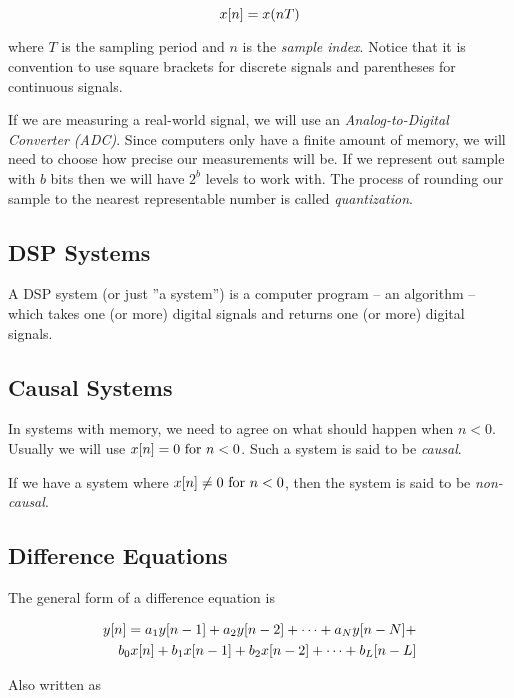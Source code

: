 \documentclass[11pt]{article}
\let\originalleft\left
\let\originalright\right
\renewcommand{\left}{\mathopen{}\mathclose\bgroup\originalleft}
\renewcommand{\right}{\aftergroup\egroup\originalright}
\def\lsqb{\left[}
\def\rsqb{\right]}
\def\sqb#1{\lsqb #1 \rsqb}
\def\xsig{x\sqb{n}}
\begin{document}
\begin{equation}
    \xsig = x(nT)
\end{equation}

where $T$ is the sampling period and $n$ is the \textit{sample index}. Notice that it is convention to use square brackets for discrete signals and parentheses for continuous signals.

If we are measuring a real-world signal, we will use an \textit{Analog-to-Digital Converter (ADC)}. Since computers only have a finite amount of memory, we will need to choose how precise our measurements will be. If we represent out sample with $b$ bits then we will have $2^b$ levels to work with. The process of rounding our sample to the nearest representable number is called \textit{quantization}.

\subsection{DSP Systems}
A DSP system (or just ''a system'') is a computer program -- an algorithm -- which takes one (or more) digital signals and returns one (or more) digital signals.

\subsection{Causal Systems}
In systems with memory, we need to agree on what should happen when $n < 0$. Usually we will use $x\left[n\right] = 0 \text{ for } n < 0$. Such a system is said to be \textit{causal}.

If we have a system where $x\left[n\right] \neq 0 \text{ for } n < 0$, then the system is said to be \textit{non-causal}.

\subsection{Difference Equations}
The general form of a difference equation is

\begin{equation}
\begin{split}
    y\sqb{n} = a_1 y\sqb{n - 1} + a_2 y\sqb{n-2} + \dots + a_N y\sqb{n-N} + \\
        b_0 x\sqb{n} + b_1 x\sqb{n - 1} + b_2 x\sqb{n - 2} + \dots + b_L\sqb{n - L}
\end{split}
\end{equation}

Also written as
\end{document}

